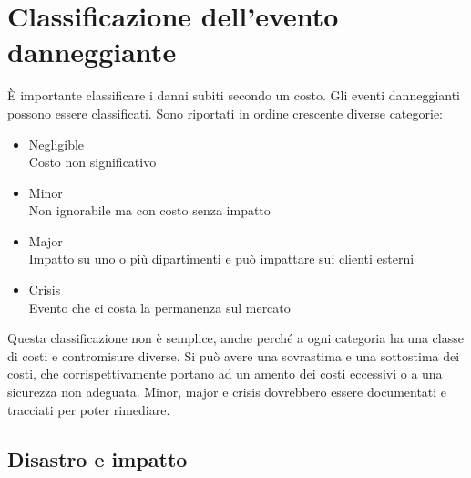 \section{Classificazione dell'evento danneggiante}

È importante classificare i danni subiti secondo un costo.
Gli eventi danneggianti possono essere classificati. Sono riportati in ordine 
crescente diverse categorie:

\begin{itemize}
\item Negligible \\
Costo non significativo
\item Minor \\
Non ignorabile ma con costo senza impatto
\item Major \\
Impatto su uno o più dipartimenti e può impattare sui clienti esterni
\item Crisis \\
Evento che ci costa la permanenza sul mercato
\end{itemize}

Questa classificazione non è semplice, anche perché a ogni categoria ha una 
classe di costi e contromisure diverse. Si può avere una sovrastima e una 
sottostima dei costi, che corrispettivamente portano ad un amento dei costi 
eccessivi o a una sicurezza non adeguata.
Minor, major e crisis dovrebbero essere documentati e tracciati per poter 
rimediare.

\subsection{Disastro e impatto}

